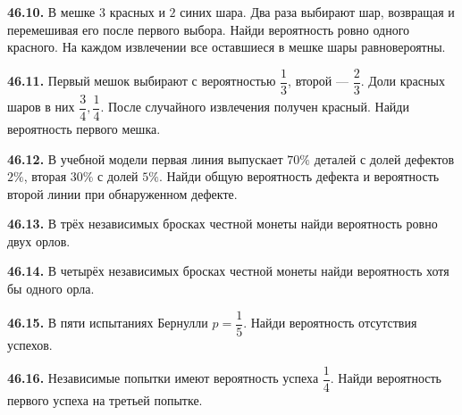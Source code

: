 \noindent\begin{minipage}[t]{\linewidth}\textbf{46.10.} В мешке \(3\) красных и \(2\) синих шара. Два раза выбирают шар, возвращая и перемешивая его после первого выбора. Найди вероятность ровно одного красного. На каждом извлечении все оставшиеся в мешке шары равновероятны.\par\end{minipage}\par
\noindent\begin{minipage}[t]{\linewidth}\textbf{46.11.} Первый мешок выбирают с вероятностью \(\dfrac13\), второй — \(\dfrac23\). Доли красных шаров в них \(\dfrac34,\dfrac14\). После случайного извлечения получен красный. Найди вероятность первого мешка.\par\end{minipage}\par
\noindent\begin{minipage}[t]{\linewidth}\textbf{46.12.} В учебной модели первая линия выпускает \(70\%\) деталей с долей дефектов \(2\%\), вторая \(30\%\) с долей \(5\%\). Найди общую вероятность дефекта и вероятность второй линии при обнаруженном дефекте.\par\end{minipage}\par
\noindent\begin{minipage}[t]{\linewidth}\textbf{46.13.} В трёх независимых бросках честной монеты найди вероятность ровно двух орлов.\par\end{minipage}\par
\noindent\begin{minipage}[t]{\linewidth}\textbf{46.14.} В четырёх независимых бросках честной монеты найди вероятность хотя бы одного орла.\par\end{minipage}\par
\noindent\begin{minipage}[t]{\linewidth}\textbf{46.15.} В пяти испытаниях Бернулли \(p=\dfrac15\). Найди вероятность отсутствия успехов.\par\end{minipage}\par
\noindent\begin{minipage}[t]{\linewidth}\textbf{46.16.} Независимые попытки имеют вероятность успеха \(\dfrac14\). Найди вероятность первого успеха на третьей попытке.\par\end{minipage}\par
